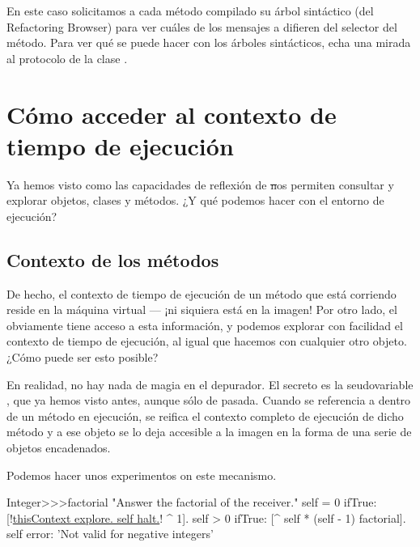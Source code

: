 \documentclass[a4paper,10pt,twoside]{book}
\begin{document}
En este caso solicitamos a cada método compilado su árbol sintáctico
(del Refactoring Browser) para ver cuáles de los mensajes a \super
difieren del selector del método.  Para ver qué se puede hacer con los
árboles sintácticos, echa una mirada al protocolo  de
la clase .

\section{Cómo acceder al contexto de tiempo de ejecución}

Ya hemos visto como las capacidades de reflexión de \st nos permiten
consultar y explorar objetos, clases y métodos.  ¿Y qué podemos hacer
con el entorno de ejecución?

\subsection{Contexto de los métodos}

De hecho, el contexto de tiempo de ejecución de un método que está
corriendo reside en la máquina virtual --- ¡ni siquiera está en la
imagen!  Por otro lado, el  obviamente tiene acceso a
esta información, y podemos explorar con facilidad el contexto de
tiempo de ejecución, al igual que hacemos con cualquier otro objeto.
¿Cómo puede ser esto posible?

En realidad, no hay nada de magia en el depurador.  El secreto es la
seudovariable , que ya hemos visto antes, aunque
sólo de pasada.  Cuando se referencia a  dentro de un
método en ejecución, se reifica el contexto completo de ejecución de
dicho método y a ese objeto se lo deja accesible a la imagen en la
forma de una serie de objetos  encadenados.

Podemos hacer unos experimentos on este mecanismo.


\begin{code}{}
Integer>>>factorial
        "Answer the factorial of the receiver."
        self = 0 ifTrue: [!\underline{thisContext explore. self halt.}! ^ 1].
        self > 0 ifTrue: [^ self * (self - 1) factorial].
        self error: 'Not valid for negative integers'
\end{code}
\end{document}

